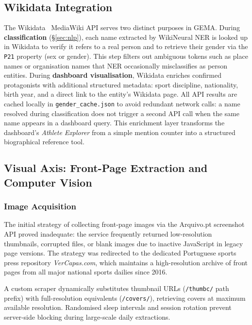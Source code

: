 \documentclass[11pt,a4paper]{article}
\begin{document}
\subsection{Wikidata Integration}
\label{sec:wikidata}

The Wikidata~\cite{Wikidata} MediaWiki API serves two distinct purposes in GEMA. During \textbf{classification} (§\ref{sec:nlp}), each name extracted by WikiNeural NER is looked up in Wikidata to verify it refers to a real person and to retrieve their gender via the \texttt{P21} property (sex or gender). This step filters out ambiguous tokens such as place names or organisation names that NER occasionally misclassifies as person entities. During \textbf{dashboard visualisation}, Wikidata enriches confirmed protagonists with additional structured metadata: sport discipline, nationality, birth year, and a direct link to the entity's Wikidata page. All API results are cached locally in \texttt{gender\_cache.json} to avoid redundant network calls: a name resolved during classification does not trigger a second API call when the same name appears in a dashboard query. This enrichment layer transforms the dashboard's \textit{Athlete Explorer} from a simple mention counter into a structured biographical reference tool.

\subsection{Visual Axis: Front-Page Extraction and Computer Vision}
\label{sec:visual}

\subsubsection{Image Acquisition}

The initial strategy of collecting front-page images via the Arquivo.pt screenshot API proved inadequate: the service frequently returned low-resolution thumbnails, corrupted files, or blank images due to inactive JavaScript in legacy page versions. The strategy was redirected to the dedicated Portuguese sports press repository \textit{VerCapas.com}, which maintains a high-resolution archive of front pages from all major national sports dailies since 2016.

A custom scraper dynamically substitutes thumbnail URLs (\texttt{/thumbc/} path prefix) with full-resolution equivalents (\texttt{/covers/}), retrieving covers at maximum available resolution. Randomised sleep intervals and session rotation prevent server-side blocking during large-scale daily extractions.
\end{document}

